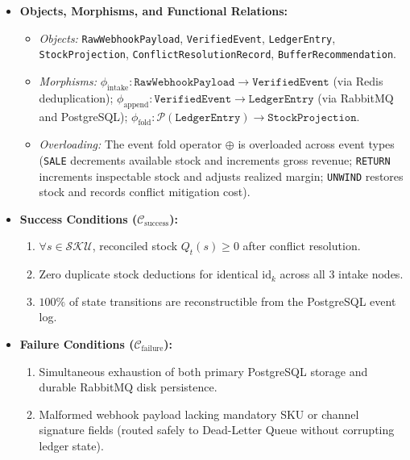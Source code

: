 \documentclass[oneside,a4paper,12pt]{report}
\begin{document}
\begin{itemize}
  \item \textbf{Objects, Morphisms, and Functional Relations:}
  \begin{itemize}
    \item \textit{Objects:} \texttt{RawWebhookPayload}, \texttt{VerifiedEvent}, \texttt{LedgerEntry}, \texttt{StockProjection}, \texttt{ConflictResolutionRecord}, \texttt{BufferRecommendation}.
    \item \textit{Morphisms:} $\phi_{\text{intake}}: \texttt{RawWebhookPayload} \rightarrow \texttt{VerifiedEvent}$ (via Redis deduplication); $\phi_{\text{append}}: \texttt{VerifiedEvent} \rightarrow \texttt{LedgerEntry}$ (via RabbitMQ and PostgreSQL); $\phi_{\text{fold}}: \mathcal{P}(\texttt{LedgerEntry}) \rightarrow \texttt{StockProjection}$.
    \item \textit{Overloading:} The event fold operator $\oplus$ is overloaded across event types (\texttt{SALE} decrements available stock and increments gross revenue; \texttt{RETURN} increments inspectable stock and adjusts realized margin; \texttt{UNWIND} restores stock and records conflict mitigation cost).
  \end{itemize}

  \item \textbf{Success Conditions ($\mathcal{C}_{\text{success}}$):}
  \begin{enumerate}
    \item $\forall s \in \mathcal{SKU}$, reconciled stock $Q_t(s) \ge 0$ after conflict resolution.
    \item Zero duplicate stock deductions for identical $\text{id}_k$ across all 3 intake nodes.
    \item $100\%$ of state transitions are reconstructible from the PostgreSQL event log.
  \end{enumerate}

  \item \textbf{Failure Conditions ($\mathcal{C}_{\text{failure}}$):}
  \begin{enumerate}
    \item Simultaneous exhaustion of both primary PostgreSQL storage and durable RabbitMQ disk persistence.
    \item Malformed webhook payload lacking mandatory SKU or channel signature fields (routed safely to Dead-Letter Queue without corrupting ledger state).
  \end{enumerate}
\end{itemize}
\end{document}
